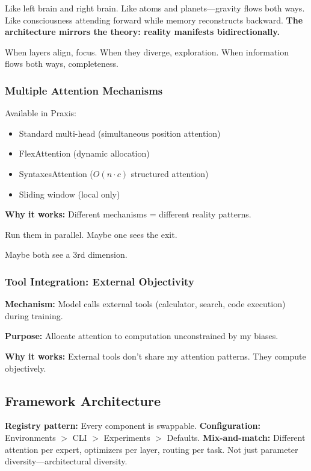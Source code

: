 \documentclass{article}
\begin{document}
Like left brain and right brain. Like atoms and planets—gravity flows both ways. Like consciousness attending forward while memory reconstructs backward. \textbf{The architecture mirrors the theory: reality manifests bidirectionally.}

When layers align, focus. When they diverge, exploration. When information flows both ways, completeness.

\subsubsection{Multiple Attention Mechanisms}

Available in Praxis:
\begin{itemize}[noitemsep]
    \item Standard multi-head (simultaneous position attention)
    \item FlexAttention (dynamic allocation)
    \item SyntaxesAttention ($O(n \cdot c)$ structured attention)
    \item Sliding window (local only)
\end{itemize}

\textbf{Why it works:} Different mechanisms = different reality patterns.

Run them in parallel. Maybe one sees the exit.

Maybe both see a 3rd dimension.

\subsubsection{Tool Integration: External Objectivity}

\textbf{Mechanism:} Model calls external tools (calculator, search, code execution) during training.

\textbf{Purpose:} Allocate attention to computation unconstrained by my biases.

\textbf{Why it works:} External tools don't share my attention patterns. They compute objectively.

\subsection{Framework Architecture}

\textbf{Registry pattern:} Every component is swappable. \textbf{Configuration:} Environments $>$ CLI $>$ Experiments $>$ Defaults. \textbf{Mix-and-match:} Different attention per expert, optimizers per layer, routing per task. Not just parameter diversity—architectural diversity.
\end{document}
